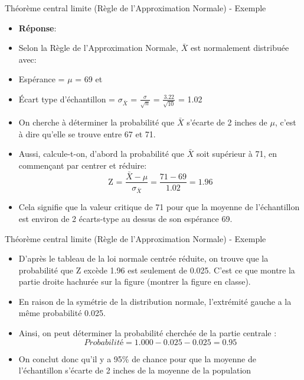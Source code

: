 \documentclass[ignorenonframetext,]{beamer}
\providecommand{\tightlist}{%
  \setlength{\itemsep}{0pt}\setlength{\parskip}{0pt}}
\begin{document}
\begin{frame}{Théorème central limite (Règle de l'Approximation Normale)
- Exemple}

\begin{itemize}
\item
  \textbf{Réponse}:
\item
  Selon la Règle de l'Approximation Normale, \(\bar{X}\) est normalement
  distribuée avec:
\item
  Espérance = \(\mu\) = 69 et
\item
  Écart type d'échantillon = \(\sigma_{\bar{X}}\) =
  \(\frac{\sigma}{\sqrt{n}}\) = \(\frac{3.22}{\sqrt{10}}\) = 1.02
\item
  On cherche à déterminer la probabilité que \(\bar{X}\) s'écarte de 2
  inches de \(\mu\), c'est à dire qu'elle se trouve entre 67 et 71.
\item
  Aussi, calcule-t-on, d'abord la probabilité que \(\bar{X}\) soit
  supérieur à 71, en commençant par centrer et réduire:
  \[\text{Z = } \frac{\bar{X}-\mu}{\sigma_{\bar{X}}} = \frac{71 - 69}{1.02} = 1.96\]
\item
  Cela signifie que la valeur critique de 71 pour que la moyenne de
  l'échantillon est environ de 2 écarts-type au dessus de son espérance
  69.
\end{itemize}

\end{frame}

\begin{frame}{Théorème central limite (Règle de l'Approximation Normale)
- Exemple}

\begin{itemize}
\tightlist
\item
  D'après le tableau de la loi normale centrée réduite, on trouve que la
  probabilité que Z excède 1.96 est seulement de 0.025. C'est ce que
  montre la partie droite hachurée sur la figure (montrer la figure en
  classe).
\item
  En raison de la symétrie de la distribution normale, l'extrémité
  gauche a la même probabilité 0.025.
\item
  Ainsi, on peut déterminer la probabilité cherchée de la partie
  centrale : \[ Probabilité = 1.000 - 0.025 - 0.025 = 0.95\]
\item
  On conclut donc qu'il y a 95\% de chance pour que la moyenne de
  l'échantillon s'écarte de 2 inches de la moyenne de la population
\end{itemize}

\end{frame}
\end{document}
